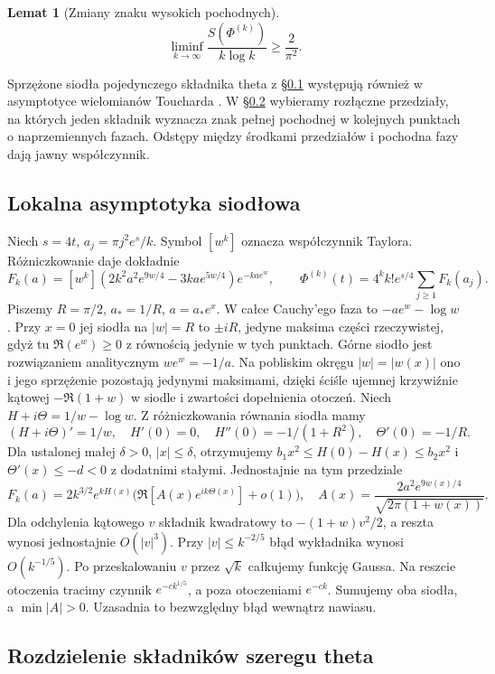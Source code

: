 \documentclass[11pt,a4paper,reqno]{amsart}
\newtheorem{lemma}[theorem]{Lemat}
\numberwithin{equation}{section}
\begin{document}
\begin{lemma}[Zmiany znaku wysokich pochodnych]\label{lem:osc}
\[\liminf_{k\to\infty}\frac{S(\Phi^{(k)})}{k\log k}\ge \frac{2}{\pi^2}.\]
\end{lemma}
Sprzężone siodła pojedynczego składnika theta z \S\ref{sec:saddle} występują również w asymptotyce wielomianów Toucharda \cite{paris}. W \S\ref{sec:count} wybieramy rozłączne przedziały, na których jeden składnik wyznacza znak pełnej pochodnej w kolejnych punktach o naprzemiennych fazach. Odstępy między środkami przedziałów i pochodna fazy dają jawny współczynnik.

\subsection{Lokalna asymptotyka siodłowa}\label{sec:saddle}


Niech \(s=4t\), \(a_j=\pi j^2 e^s/k\). Symbol \([w^k]\) oznacza współczynnik Taylora. Różniczkowanie daje dokładnie \[ F_k(a)=[w^k](2k^2a^2 e^{9w/4}-3ka e^{5w/4})e^{-kae^w},\qquad
\Phi^{(k)}(t)=4^k k! e^{s/4}\sum_{j\ge1}F_k(a_j).\] Piszemy \(R=\pi/2\), \(a_*=1/R\), \(a=a_*e^x\). W całce Cauchy'ego faza to \(-ae^w-\log w\). Przy \(x=0\) jej siodła na \(|w|=R\) to \(\pm iR\), jedyne maksima części rzeczywistej, gdyż tu \(\Re(e^w)\ge0\) z równością jedynie w tych punktach. Górne siodło jest rozwiązaniem analitycznym \(we^w=-1/a\). Na pobliskim okręgu \(|w|=|w(x)|\) ono i jego sprzężenie pozostają jedynymi maksimami, dzięki ściśle ujemnej krzywiźnie kątowej \(-\Re(1+w)\) w siodle i zwartości dopełnienia otoczeń. Niech \(H+i\Theta=1/w-\log w\). Z różniczkowania równania siodła mamy \[(H+i\Theta)'=1/w,\quad H'(0)=0,\quad H''(0)=-1/(1+R^2),\quad \Theta'(0)=-1/R.\] Dla ustalonej małej \(\delta>0\), \(|x|\le\delta\), otrzymujemy \(b_1x^2\le H(0)-H(x)\le b_2x^2\) i \(\Theta'(x)\le-d<0\) z dodatnimi stałymi. Jednostajnie na tym przedziale \[F_k(a)=2k^{3/2}e^{kH(x)}\big(\Re[A(x)e^{ik\Theta(x)}]+o(1)\big),\quad
 A(x)=\frac{2a^2 e^{9w(x)/4}}{\sqrt{2\pi(1+w(x))}}.\] Dla odchylenia kątowego \(v\) składnik kwadratowy to \(-(1+w)v^2/2\), a reszta wynosi jednostajnie \(O(|v|^3)\). Przy \(|v|\le k^{-2/5}\) błąd wykładnika wynosi \(O(k^{-1/5})\). Po przeskalowaniu \(v\) przez \(\sqrt{k}\) całkujemy funkcję Gaussa. Na reszcie otoczenia tracimy czynnik \(e^{-c k^{1/5}}\), a poza otoczeniami \(e^{-ck}\). Sumujemy oba siodła, a \(\min|A|>0\). Uzasadnia to bezwzględny błąd wewnątrz nawiasu.

\subsection{Rozdzielenie składników szeregu theta}\label{sec:count}
\end{document}

